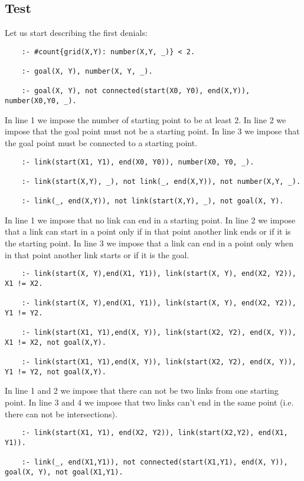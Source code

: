 \subsection{Test}
Let us start describing the first denials:

\begin{verbatim}
    :- #count{grid(X,Y): number(X,Y, _)} < 2. 

    :- goal(X, Y), number(X, Y, _). 
    
    :- goal(X, Y), not connected(start(X0, Y0), end(X,Y)), number(X0,Y0, _). 
\end{verbatim}

In line 1 we impose the number of starting point to be at least 2. In line 2 we impose that the goal point must not be a starting point.
In line 3 we impose that the goal point must be connected to a starting point.


\begin{verbatim}
    :- link(start(X1, Y1), end(X0, Y0)), number(X0, Y0, _). 

    :- link(start(X,Y), _), not link(_, end(X,Y)), not number(X,Y, _).
    
    :- link(_, end(X,Y)), not link(start(X,Y), _), not goal(X, Y). 
\end{verbatim}
In line 1 we impose that no link can end in a starting point. In line 2 we impose that a link can start in a point only if in that point another link ends or if it is the starting point. In line 3 we impose that a link can end in a point only when in that point another link starts or if it is the goal.


\begin{verbatim}
    :- link(start(X, Y),end(X1, Y1)), link(start(X, Y), end(X2, Y2)), X1 != X2. 

    :- link(start(X, Y),end(X1, Y1)), link(start(X, Y), end(X2, Y2)), Y1 != Y2. 
    
    :- link(start(X1, Y1),end(X, Y)), link(start(X2, Y2), end(X, Y)), X1 != X2, not goal(X,Y). 
    
    :- link(start(X1, Y1),end(X, Y)), link(start(X2, Y2), end(X, Y)), Y1 != Y2, not goal(X,Y). 
\end{verbatim}

In line 1 and 2 we impose that there can not be two links from one starting point. In line 3 and 4 we impose that two links can't end in the same point (i.e. there can not be intersections).
\begin{verbatim}
    :- link(start(X1, Y1), end(X2, Y2)), link(start(X2,Y2), end(X1, Y1)).

    :- link(_, end(X1,Y1)), not connected(start(X1,Y1), end(X, Y)), goal(X, Y), not goal(X1,Y1). 
\end{verbatim}

